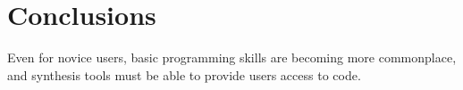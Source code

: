 \section{Conclusions}
\label{conclusions}

Even for novice users, basic programming skills are becoming more commonplace, and synthesis tools must be able to provide users access to code.